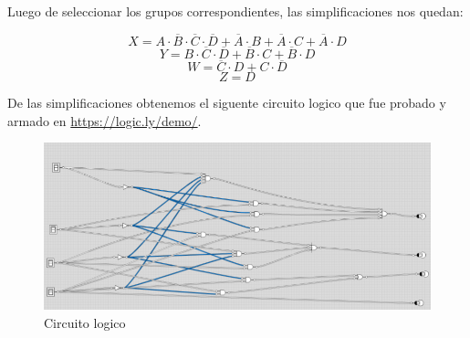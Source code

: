 \documentclass{report}
\begin{document}
Luego de seleccionar los grupos correspondientes, las simplificaciones nos quedan:
\begin{center}
		$$ X =  A \cdot \overline{B} \cdot \overline{C} \cdot \overline{D} +\overline{A} \cdot B +\overline{A} \cdot C +\overline{A} \cdot D$$
		$$ Y =  B \cdot \overline{C} \cdot \overline{D}  +  \overline{B} \cdot C + \overline{B} \cdot D $$
		$$ W = \overline{C} \cdot D  + C \cdot \overline{D} $$
		$$ Z =   D $$
\end{center}
De las simplificaciones obtenemos el siguente circuito logico que fue probado y armado en \href{https://logic.ly/demo/}{https://logic.ly/demo/}.
\begin{figure}[h!]
	\centering
	\includegraphics[width=\linewidth]{CircuitoLogico.png}
	\caption{Circuito logico}
\end{figure}
\end{document}
